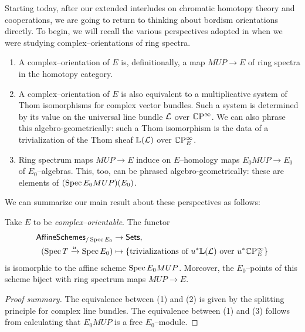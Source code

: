 Starting today, after our extended interludes on chromatic homotopy theory and cooperations, we are going to return to thinking about bordism orientations directly.  To begin, we will recall the various perspectives adopted in  when we were studying complex--orientations of ring spectra.
\begin{enumerate}
\item A complex--orientation of $E$ is, definitionally, a map $MUP \to E$ of ring spectra in the homotopy category.
\item A complex--orientation of $E$ is also equivalent to a multiplicative system of Thom isomorphisms for complex vector bundles.  Such a system is determined by its value on the universal line bundle $\mathcal{L}$ over $\mathbb{C}\mathrm P^\infty$.  We can also phrase this algebro-geometrically: such a Thom isomorphism is the data of a trivialization of the Thom sheaf $\mathbb{L}(\mathcal{L})$ over $\mathbb{C}\mathrm P^\infty_E$.
\item Ring spectrum maps $MUP \to E$ induce on $E$--homology maps $E_0 MUP \to E_0$ of $E_0$--algebras.  This, too, can be phrased algebro-geometrically: these are elements of $(\operatorname{Spec} E_0 MUP)(E_0)$.
\end{enumerate}
We can summarize our main result about these perspectives as follows:
\begin{theorem}\label{BUZTriumvirate}
Take $E$ to be \emph{complex--orientable}.  The functor
\begin{align*}
\mathsf{AffineSchemes}_{/\operatorname{Spec} E_0} & \to \mathsf{Sets}, \\
(\operatorname{Spec} T \xrightarrow{u} \operatorname{Spec} E_0) & \mapsto \left\{ \text{trivializations of $u^* \mathbb{L}(\mathcal{L})$ over $u^* \mathbb{C}\mathrm P^\infty_E$} \right\}
\end{align*}
is isomorphic to the affine scheme $\operatorname{Spec} E_0 MUP$.  Moreover, the $E_0$--points of this scheme biject with ring spectrum maps $MUP \to E$.
\end{theorem}
\begin{proof}[Proof summary]
The equivalence between (1) and (2) is given by the splitting principle for complex line bundles.  The equivalence between (1) and (3) follows from calculating that $E_0 MUP$ is a free $E_0$--module.
\end{proof}

